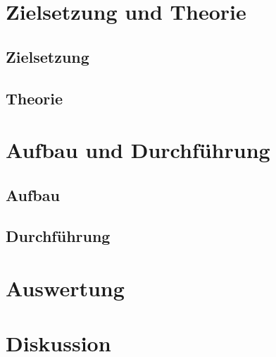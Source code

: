 





\maketitle
\tableofcontents
\newpage

\section{Zielsetzung und Theorie}

\subsection{Zielsetzung}


\subsection{Theorie}


\section{Aufbau und Durchführung}

\subsection{Aufbau}


\subsection{Durchführung}


% 

\section{Auswertung}


\section{Diskussion}


\newpage
\printbibliography


